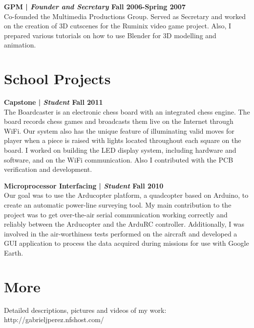 \documentclass[margin,line]{res}
\begin{document}
\begin{resume}
{\bf GPM | {\em Founder and Secretary} \hfill {\bf Fall 2006-Spring 2007 \\} }
\vspace{-.01cm}
Co-founded the Multimedia Productions Group. Served as Secretary and worked on the creation of 3D cutscenes for the Ruminix video game project. Also, I prepared various tutorials on how to use Blender for 3D modelling and animation.

\section{\sc School Projects}

{\bf Capstone | {\em Student} \hfill {\bf Fall 2011 \\} }
\vspace{-.01cm}
The Boardcaster is an electronic chess board with an integrated chess engine. The board records chess games and broadcasts them live on the Internet through WiFi. Our system also has the unique feature of illuminating valid moves for player when a piece is raised with lights located throughout each square on the board. I worked on building the LED display system, including hardware and software, and on the WiFi communication. Also I contributed with the PCB verification and development.

{\bf Microprocessor Interfacing | {\em Student} \hfill {\bf Fall 2010 \\} }
\vspace{-.01cm}
Our goal was to use the Arducopter platform, a quadcopter based on Arduino, to create an automatic power-line surveying tool. My main contribution to the project was to get over-the-air serial communication working correctly and reliably between the Arducopter and the ArduRC controller. Additionally, I was involved in the air-worthiness tests performed on the aircraft and developed a GUI application to process the data acquired during missions for use with Google Earth.

\section{\sc More}
Detailed  descriptions, pictures and videos of my work: http://gabrieljperez.nfshost.com/    \\

\end{resume}
\end{document}

